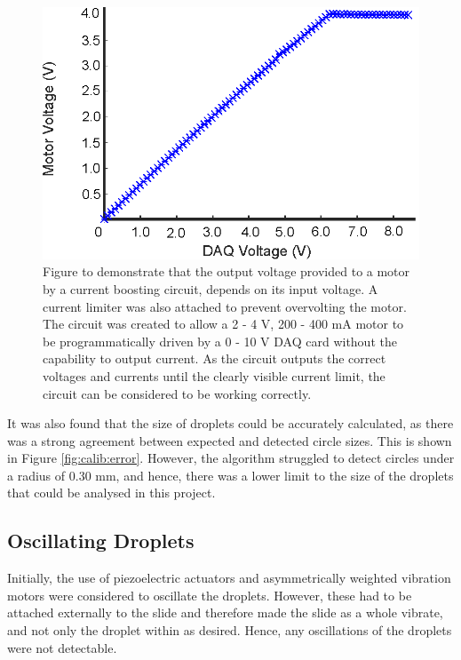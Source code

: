 \documentclass{physics_article_B}
\begin{document}
        \begin{figure}[H]
            \centering
            \hspace*{-1cm}\includegraphics{Figures/MotorCalib.eps}
            \caption{Figure to demonstrate that the output voltage provided to a motor by a current boosting circuit, depends on its input voltage. A current limiter was also attached to prevent overvolting the motor. The circuit was created to allow a 2 - 4 V, 200 - 400 mA motor to be programmatically driven by a 0 - 10 V DAQ card without the capability to output current. As the circuit outputs the correct voltages and currents until the clearly visible current limit, the circuit can be considered to be working correctly.}\label{fig:MotorCalib}
        \end{figure}
        
        It was also found that the size of droplets could be accurately calculated, as there was a strong agreement between expected and detected circle sizes. This is shown in Figure \ref{fig:calib:error}. However, the algorithm struggled to detect circles under a radius of 0.30 mm, and hence, there was a lower limit to the size of the droplets that could be analysed in this project.
        
        
    \subsection{Oscillating Droplets\label{sect:results:oscillation}}
      
        Initially, the use of piezoelectric actuators and asymmetrically weighted vibration motors were considered to oscillate the droplets. However, these had to be attached externally to the slide and therefore made the slide as a whole vibrate, and not only the droplet within as desired. Hence, any oscillations of the droplets were not detectable.
        
\end{document}
